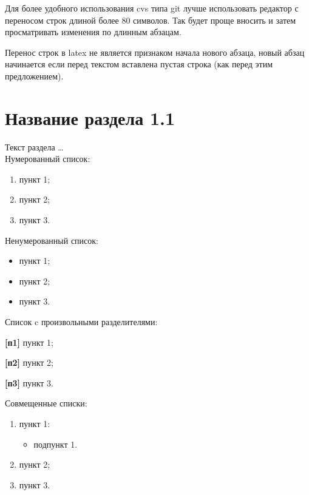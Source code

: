 
%
%
%
%

\begin{singlespace}
   \label{chapt1}
\end{singlespace}

Для более удобного использования cvs типа git лучше использовать
редактор с переносом строк длиной более 80 символов. Так будет проще
вносить и затем просматривать изменения по длинным абзацам.

Перенос строк в latex не является признаком начала нового абзаца,
новый абзац начинается если перед текстом вставлена пустая строка (как
перед этим предложением). \\

\section{Название раздела 1.1} \label{sect1_1}

Текст раздела \dots{} \\

Нумерованный список:
\begin{enumerate}
\item пункт 1;
\item пункт 2;
\item пункт 3. \\
\end{enumerate}

Ненумерованный список:
\begin{itemize}
\item пункт 1;
\item пункт 2;
\item пункт 3. \\
\end{itemize}

Список c произвольными разделителями:
\begin{description}
\item{\textbf{[п1]}} пункт 1;
\item{\textbf{[п2]}} пункт 2;
\item{\textbf{[п3]}} пункт 3. \\
\end{description}

Совмещенные списки:
\begin{enumerate}
\item пункт 1:
      \begin{itemize}
      \item подпункт 1.
      \end{itemize}
\item пункт 2;
\item пункт 3. \\
\end{enumerate}

